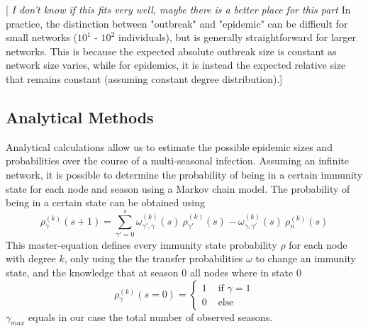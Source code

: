 \documentclass[11pt, a4paper]{article}
\begin{document}
[\textit{ I don't know if this fits very well, maybe there is a better place for this part} In practice, the distinction between "outbreak" and "epidemic" can be difficult for small networks ($10^{1}$ - $10^{2}$ individuals), but is generally straightforward for larger networks. This is because the expected absolute outbreak size is constant as network size varies, while for epidemics, it is instead the expected relative size that remains constant (assuming constant degree distribution).]

\subsection{Analytical Methods}
Analytical calculations allow us to estimate the possible epidemic sizes and probabilities over the course of a multi-seasonal infection. Assuming an infinite network, it is possible to determine the probability of being in a certain immunity state for each node and season using a Markov chain model. The probability of being in a certain state can be obtained using
\begin{equation}
\rho_{\gamma}^{(k)} (s + 1) = \sum \limits_{\gamma'=0}^{s} \omega_{\gamma', \gamma}^{(k)} (s) \: \rho_{\gamma'}^{(k)} (s) - \omega_{\gamma, \gamma'}^{(k)} (s) \: \rho_{n}^{(k)} (s)
\end{equation}
This master-equation defines every immunity state probability $\rho$ for each node with degree $k$, only using the the transfer probabilities $\omega$ to change an immunity state, and the knowledge that at season $0$ all nodes where in state $0$
\begin{equation}
\rho_{\gamma}^{(k)} (s = 0)  = \begin{cases}
1 & \textrm{ if } \gamma = 1 \\
0 & \textrm{ else}
\end{cases}
\end{equation}
$\gamma_{max}$ equals in our case the total number of observed seasons.
\end{document}
